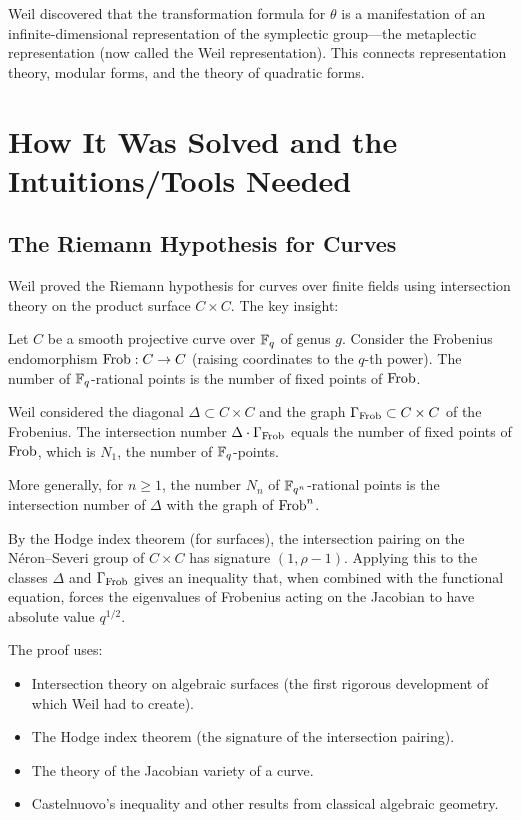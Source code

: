 Weil discovered that the transformation formula for $\theta$ is a manifestation of an infinite-dimensional representation of the symplectic group---the metaplectic representation (now called the Weil representation). This connects representation theory, modular forms, and the theory of quadratic forms.

\section{How It Was Solved and the Intuitions/Tools Needed}

\subsection{The Riemann Hypothesis for Curves}

Weil proved the Riemann hypothesis for curves over finite fields using intersection theory on the product surface $C \times C$. The key insight:

Let $C$ be a smooth projective curve over $\mathbb{F}_q$ of genus $g$. Consider the Frobenius endomorphism $\operatorname{Frob}: C \to C$ (raising coordinates to the $q$-th power). The number of $\mathbb{F}_q$-rational points is the number of fixed points of $\operatorname{Frob}$.

Weil considered the diagonal $\Delta \subset C \times C$ and the graph $\Gamma_{\operatorname{Frob}} \subset C \times C$ of the Frobenius. The intersection number $\Delta \cdot \Gamma_{\operatorname{Frob}}$ equals the number of fixed points of $\operatorname{Frob}$, which is $N_1$, the number of $\mathbb{F}_q$-points.

More generally, for $n \geq 1$, the number $N_n$ of $\mathbb{F}_{q^n}$-rational points is the intersection number of $\Delta$ with the graph of $\operatorname{Frob}^n$.

By the Hodge index theorem (for surfaces), the intersection pairing on the N\'eron--Severi group of $C \times C$ has signature $(1, \rho - 1)$. Applying this to the classes $\Delta$ and $\Gamma_{\operatorname{Frob}}$ gives an inequality that, when combined with the functional equation, forces the eigenvalues of Frobenius acting on the Jacobian to have absolute value $q^{1/2}$.

The proof uses:
\begin{itemize}
    \item Intersection theory on algebraic surfaces (the first rigorous development of which Weil had to create).
    \item The Hodge index theorem (the signature of the intersection pairing).
    \item The theory of the Jacobian variety of a curve.
    \item Castelnuovo's inequality and other results from classical algebraic geometry.
\end{itemize}

